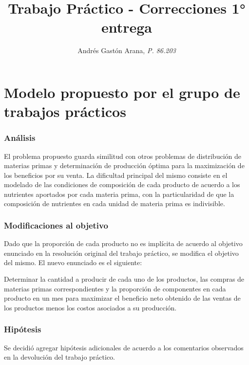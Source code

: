 \documentclass[a4paper,11pt]{article}
\title{\textbf{Trabajo Práctico} - Correcciones 1° entrega}
\author{Andrés Gastón Arana, \textit{P. 86.203}}
\date{}
\begin{document}
\maketitle
\clearpage

\part{Modelo propuesto por el grupo de trabajos prácticos}

\section{Análisis}

El problema propuesto guarda similitud con otros problemas de distribución de
materias primas y determinación de producción óptima para la maximización de
los beneficios por su venta. La dificultad principal del mismo consiste en el
modelado de las condiciones de composición de cada producto de acuerdo a los
nutrientes aportados por cada materia prima, con la particularidad de que la
composición de nutrientes en cada unidad de materia prima es indivisible.

\section{Modificaciones al objetivo}

Dado que la proporción de cada producto no es implícita de acuerdo al objetivo
enunciado en la resolución original del trabajo práctico, se modifica el
objetivo del mismo. El nuevo enunciado es el siguiente:

Determinar la cantidad a producir de cada uno de los productos, las compras de
materias primas correspondientes y la proporción de componentes en cada
producto en un mes para maximizar el beneficio neto obtenido de las ventas de
los productos menos los costos asociados a su producción.

\section{Hipótesis}

Se decidió agregar hipótesis adicionales de acuerdo a los comentarios
observados en la devolución del trabajo práctico.
\end{document}

